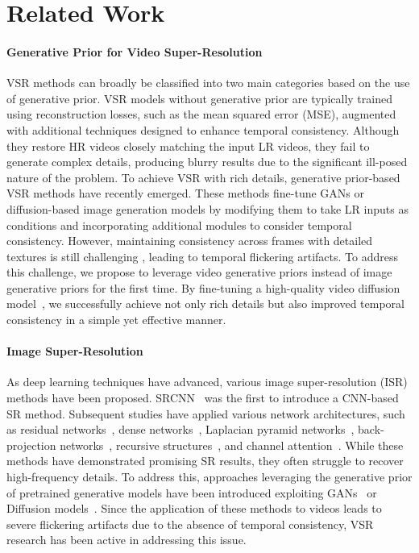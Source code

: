 

\section{Related Work}
\paragraph{Generative Prior for Video Super-Resolution}
VSR methods can broadly be classified into two main categories based on the use of generative prior. VSR models without generative prior \cite{Youk_2024_CVPR, chan2021basicvsr, chan2022basicvsrpp, chan2022investigating, fastrealVSR, realviformer} are typically trained using reconstruction losses, such as the mean squared error (MSE), augmented with additional techniques designed to enhance temporal consistency. Although they restore HR videos closely matching the input LR videos, they fail to generate complex details, producing blurry results due to the significant ill-posed nature of the problem. To achieve VSR with rich details, generative prior-based VSR methods \cite{rota2024stablevsr, xu2024videogigagan, chen2024sateco, zhou2024upscaleavideo, yang2023mgldvsr} have recently emerged. These methods fine-tune GANs \cite{gan} or diffusion-based image generation models by modifying them to take LR inputs as conditions and incorporating additional modules to consider temporal consistency. However, maintaining consistency across frames with detailed textures is still challenging \cite{blattmann2023stablevideodiffusionscaling,blattmann2023videoldm}, leading to temporal flickering artifacts. To address this challenge, we propose to leverage video generative priors instead of image generative priors for the first time. By fine-tuning a high-quality video diffusion model~\cite{svd}, we successfully achieve not only rich details but also improved temporal consistency in a simple yet effective manner.

\paragraph{Image Super-Resolution}
As deep learning techniques have advanced, various image super-resolution (ISR) methods have been proposed. SRCNN~\cite{srcnn} was the first to introduce a CNN-based SR method. Subsequent studies have applied various network architectures, such as residual networks~\cite{vdsr,srgan}, dense networks~\cite{rdn,esrgan,real-esrgan}, Laplacian pyramid networks~\cite{lapsrn}, back-projection networks~\cite{dbpn}, recursive structures~\cite{drcn,drrn}, and channel attention~\cite{rcan}. While these methods have demonstrated promising SR results, they often struggle to recover high-frequency details. To address this, approaches leveraging the generative prior of pretrained generative models have been introduced exploiting GANs~\cite{glean,pulse} or Diffusion models~\cite{stablesr,supir,diffbir,pasd,seesr,ccsr,wu2024one}. Since the application of these methods to videos leads to severe flickering artifacts due to the absence of temporal consistency, VSR research has been active in addressing this issue.

